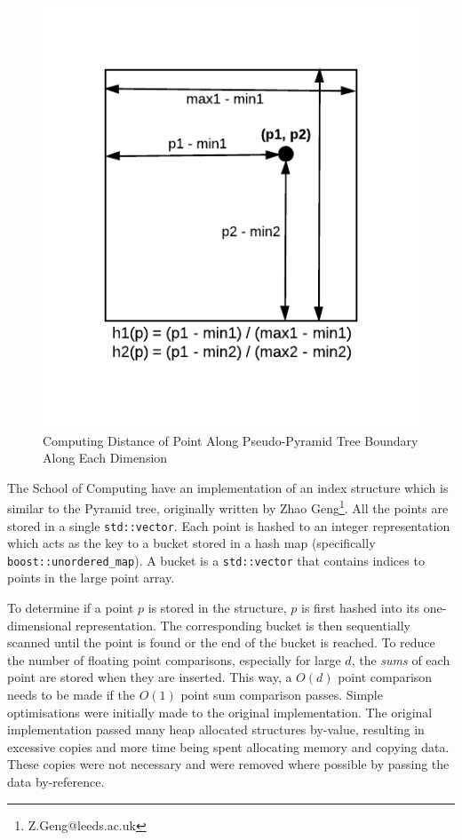 \begin{figure}
	\vspace{-40pt}
	\begin{center}
		\includegraphics[scale=0.6]{figures/pseudo-pyramid_tree_point_boundary_distances.pdf}
	\end{center}
	\vspace{-20pt}
	\caption{Computing Distance of Point Along Pseudo-Pyramid Tree Boundary Along Each Dimension}
	\label{fig:point-boundary-distance}
\end{figure}

The School of Computing have an implementation of an index structure which is similar to the Pyramid tree, originally written by Zhao Geng\footnote{Z.Geng@leeds.ac.uk}. All the points are stored in a single \texttt{std::vector}. Each point is hashed to an integer representation which acts as the key to a bucket stored in a hash map (specifically \texttt{boost::unordered\_map}). A bucket is a \texttt{std::vector} that contains indices to points in the large point array.

To determine if a point $p$ is stored in the structure, $p$ is first hashed into its one-dimensional representation. The corresponding bucket is then sequentially scanned until the point is found or the end of the bucket is reached. To reduce the number of floating point comparisons, especially for large $d$, the \textit{sums} of each point are stored when they are inserted. This way, a $O(d)$ point comparison needs to be made if the $O(1)$ point sum comparison passes. Simple optimisations were initially made to the original implementation. The original implementation passed many heap allocated structures by-value, resulting in excessive copies and more time being spent allocating memory and copying data. These copies were not necessary and were removed where possible by passing the data by-reference.

